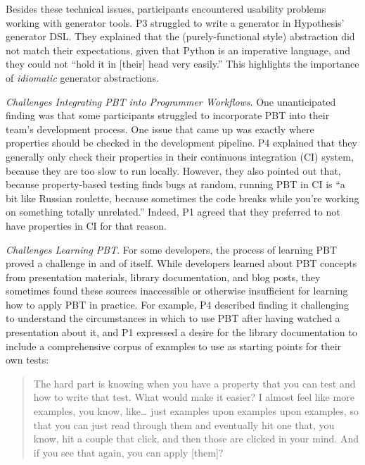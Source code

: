Besides these technical issues,
participants encountered usability problems working with generator tools. P3 struggled to
write a generator in Hypothesis' generator DSL. They
explained that the (purely-functional style) abstraction did not match their expectations, given that Python is an imperative language, and they could
not ``hold it in [their] head very easily.'' This highlights the importance of
{\em idiomatic} generator abstractions.

\textit{Challenges Integrating PBT into Programmer Workflows}.
One unanticipated finding was that some participants struggled to incorporate
PBT into their team's development process. One issue
that came up was exactly where properties should be checked in the development pipeline.
P4 explained that they generally only check their properties in their
continuous integration (CI) system, because they are too slow to run locally.
However, they also pointed out that, because property-based testing finds
bugs at random, running PBT in CI is ``a bit like
Russian roulette, because sometimes the code breaks while you're working on
something totally unrelated.'' Indeed, P1 agreed that they preferred
to not have properties in CI for that reason.

\textit{Challenges Learning PBT}.
For some developers, the process of learning PBT proved a challenge in and of
itself.  While developers learned about PBT concepts from presentation
materials, library documentation, and blog posts, they sometimes found these
sources inaccessible or otherwise insufficient for learning how to apply PBT in practice.
For example, P4 described finding it challenging to understand the circumstances
in which to use PBT after having watched a presentation about it, and P1
expressed a desire for the library documentation to
include a comprehensive corpus of examples to use as starting points for their own tests:
\begin{quote}
  The hard part is knowing when you
  have a property that you can test and how to write that test. What
  would make it easier? I almost feel like more examples, you know,
  like\ldots{} just examples upon examples upon examples, so that you can just
  read through them and eventually hit one that, you know, hit a
  couple that click, and then those are clicked in your mind. And if you see
  that again, you can apply [them]?
\end{quote}

